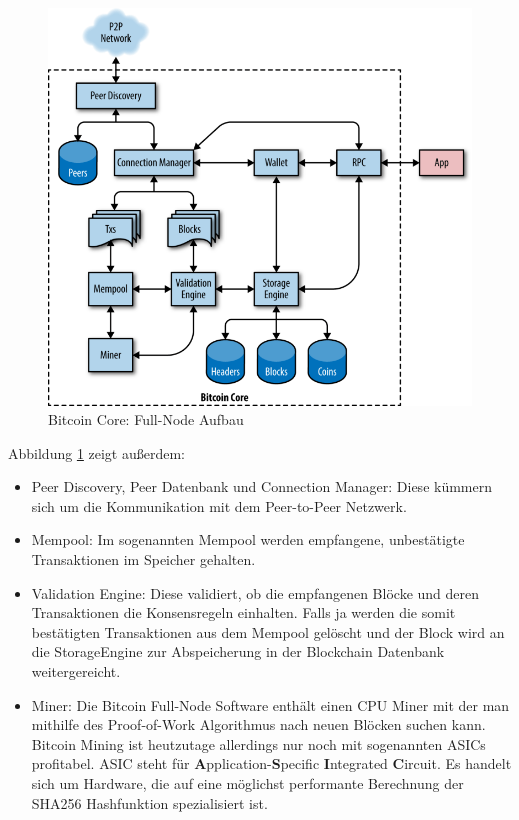 \begin{figure}[H]
\centering
\includegraphics[width=1\linewidth]{Figures/btc_core_full_node_architecture}
\decoRule
\caption{Bitcoin Core: Full-Node Aufbau \cite{mastering_bitcoin}}
\label{fig:btc_core_full_node_architecture}
\end{figure}
Abbildung \ref{fig:btc_core_full_node_architecture} zeigt außerdem: 
\begin{itemize}
\item Peer Discovery, Peer Datenbank und Connection Manager: Diese kümmern sich um die Kommunikation mit dem Peer-to-Peer Netzwerk.
\item Mempool: Im sogenannten Mempool werden empfangene, unbestätigte Transaktionen im Speicher gehalten.
\item Validation Engine: Diese validiert, ob die empfangenen Blöcke und deren Transaktionen die Konsensregeln einhalten. Falls ja werden die somit bestätigten Transaktionen aus dem Mempool gelöscht und der Block wird an die StorageEngine zur Abspeicherung in der Blockchain Datenbank weitergereicht.
\item Miner: Die Bitcoin Full-Node Software enthält einen CPU Miner mit der man mithilfe des Proof-of-Work Algorithmus nach neuen Blöcken suchen kann. Bitcoin Mining ist heutzutage allerdings nur noch mit sogenannten ASICs profitabel. ASIC steht für \textbf{A}pplication-\textbf{S}pecific \textbf{I}ntegrated \textbf{C}ircuit. Es handelt sich um Hardware, die auf eine möglichst performante Berechnung der SHA256 Hashfunktion spezialisiert ist.
\end{itemize}


